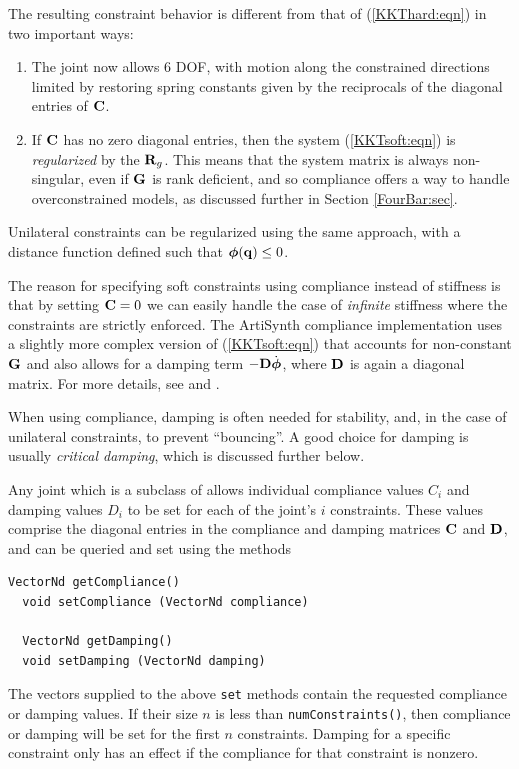 The resulting constraint behavior is different from that of
(\ref{KKThard:eqn}) in two important ways:

\begin{enumerate}

\item The joint now allows 6 DOF, with motion along the constrained directions
limited by restoring spring constants given by the reciprocals of the
diagonal entries of ${\bf C}$.

\item If ${\bf C}$ has no zero diagonal entries, then the system
(\ref{KKTsoft:eqn}) is {\it regularized} by the ${\bf R}_g$.  This means that the
system matrix is always non-singular, even if ${\bf G}$ is rank deficient, and so
compliance offers a way to handle overconstrained models, as discussed further
in Section \ref{FourBar:sec}.

\end{enumerate}

Unilateral constraints can be regularized using the same approach,
with a distance function defined such that $\boldsymbol\phi({\bf q}) \le 0$.  

The reason for specifying soft constraints using compliance instead of
stiffness is that by setting ${\bf C} = 0$ we can easily handle the case of
{\it infinite} stiffness where the constraints are strictly enforced.
The ArtiSynth compliance implementation uses a slightly more complex
version of (\ref{KKTsoft:eqn}) that accounts for non-constant ${\bf G}$ and
also allows for a damping term $-{\bf D} \dot{\boldsymbol\phi}$, where ${\bf D}$ is again a
diagonal matrix.  For more details, see \cite{lacoursiere2007ghosts}
and \cite{servin2006interactive}.

When using compliance, damping is often needed for stability, and, in
the case of unilateral constraints, to prevent ``bouncing''.  A good
choice for damping is usually {\it critical damping}, which is
discussed further below.

Any joint which is a subclass of
 allows
individual compliance values $C_i$ and damping values $D_i$ to be set
for each of the joint's $i$ constraints. These values comprise the
diagonal entries in the compliance and damping matrices ${\bf C}$ and ${\bf D}$,
and can be queried and set using the methods
\begin{lstlisting}[]
  VectorNd getCompliance()
  void setCompliance (VectorNd compliance)

  VectorNd getDamping()
  void setDamping (VectorNd damping)
\end{lstlisting}
%
The vectors supplied to the above {\tt set} methods contain the
requested compliance or damping values. If their size $n$ is less than
{\tt numConstraints()}, then compliance or damping will be set for the
first $n$ constraints.  Damping for a specific constraint only has an
effect if the compliance for that constraint is nonzero.

